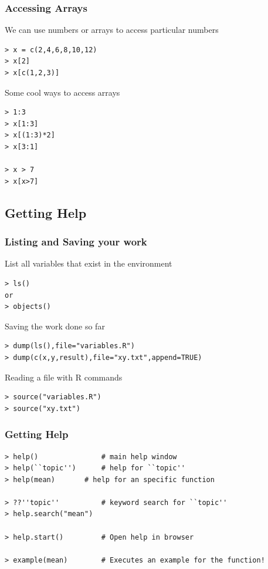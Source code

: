 \documentclass[10pt]{beamer}
\begin{document}
\begin{frame}
  \frametitle{Accessing Arrays}
  \begin{block}{We can use numbers or arrays to access particular numbers}
\begin{verbatim}
> x = c(2,4,6,8,10,12)
> x[2]
> x[c(1,2,3)]
\end{verbatim}
  \end{block}
  \begin{block}{Some cool ways to access arrays}
\begin{verbatim}
> 1:3
> x[1:3]
> x[(1:3)*2]
> x[3:1]

> x > 7
> x[x>7]
\end{verbatim}
  \end{block}
\end{frame}

\subsection{Getting Help}
\begin{frame}
  \frametitle{Listing and Saving your work}

\begin{block}{List all variables that exist in the environment}
\begin{verbatim}
> ls()
or
> objects()
\end{verbatim}
\end{block}

\begin{block}{Saving the work done so far}
\begin{verbatim}
> dump(ls(),file="variables.R")
> dump(c(x,y,result),file="xy.txt",append=TRUE)
\end{verbatim}
\end{block}

\begin{block}{Reading a file with R commands}
\begin{verbatim}
> source("variables.R")
> source("xy.txt")
\end{verbatim}
\end{block}
\end{frame}

\begin{frame}
  \frametitle{Getting Help}

\begin{verbatim}
> help()               # main help window
> help(``topic'')      # help for ``topic''
> help(mean)       # help for an specific function

> ??''topic''          # keyword search for ``topic''
> help.search("mean")

> help.start()         # Open help in browser

> example(mean)        # Executes an example for the function!
\end{verbatim}
\end{frame}
\end{document}
